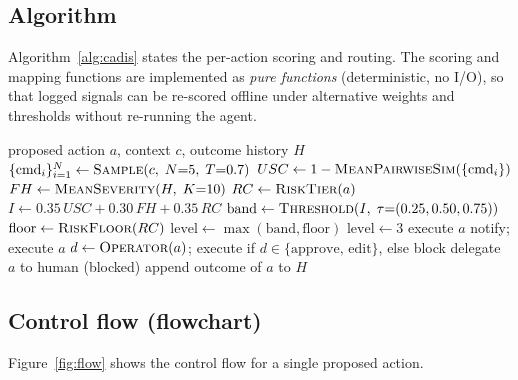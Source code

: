 \documentclass[11pt]{article}
\begin{document}
\subsection{Algorithm}
Algorithm~\ref{alg:cadis} states the per-action scoring and routing. The scoring and mapping functions
are implemented as \emph{pure functions} (deterministic, no I/O), so that logged signals can be
re-scored offline under alternative weights and thresholds without re-running the agent.

\begin{algorithm}[t]
\caption{CADIS per-action scoring and routing}\label{alg:cadis}
\begin{algorithmic}[1]
\Require proposed action $a$, context $c$, outcome history $H$
\State $\{\mathrm{cmd}_i\}_{i=1}^{N}\gets \textsc{Sample}(c,\;N{=}5,\;T{=}0.7)$ 
\State $USC \gets 1-\textsc{MeanPairwiseSim}(\{\mathrm{cmd}_i\})$
\State $FH \gets \textsc{MeanSeverity}(H,\;K{=}10)$
\State $RC \gets \textsc{RiskTier}(a)$ 
\State $I \gets 0.35\,USC + 0.30\,FH + 0.35\,RC$
\State $\mathrm{band}\gets \textsc{Threshold}(I,\;\tau{=}(0.25,0.50,0.75))$
\State $\mathrm{floor}\gets \textsc{RiskFloor}(RC)$
\State $\mathrm{level}\gets \max(\mathrm{band},\mathrm{floor})$
    \State $\mathrm{level}\gets 3$ 
\EndIf
{}
    \State execute $a$
    \State notify; execute $a$
    \State $d\gets \textsc{Operator}(a)$; execute if $d\in\{\text{approve, edit}\}$, else block
\Else
    \State delegate $a$ to human (blocked)
\EndIf
\State append outcome of $a$ to $H$ 
\end{algorithmic}
\end{algorithm}

\subsection{Control flow (flowchart)}
Figure~\ref{fig:flow} shows the control flow for a single proposed action.
\end{document}
